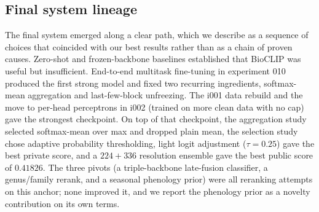\subsection{Final system lineage}
The final system emerged along a clear path, which we describe as a sequence of choices
that coincided with our best results rather than as a chain of proven causes. Zero-shot
and frozen-backbone baselines established that BioCLIP was useful but insufficient.
End-to-end multitask fine-tuning in experiment 010 produced the first strong model and
fixed two recurring ingredients, softmax-mean aggregation and last-few-block
unfreezing. The i001 data rebuild and the move to per-head perceptrons in i002 (trained
on more clean data with no cap) gave the strongest checkpoint. On top of that
checkpoint, the aggregation study selected softmax-mean over max and dropped plain mean,
the selection study chose adaptive probability thresholding, light logit adjustment
($\tau{=}0.25$) gave the best private score, and a $224{+}336$ resolution ensemble gave
the best public score of $0.41826$. The three pivots (a triple-backbone late-fusion classifier, a
genus/family rerank, and a seasonal phenology prior) were all reranking attempts on this
anchor; none improved it, and we report the phenology prior as a novelty contribution
on its own terms.

